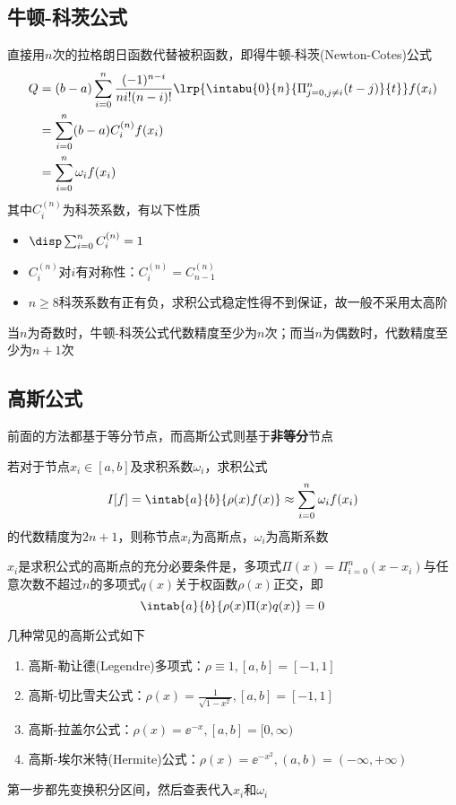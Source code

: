 \subsection{牛顿-科茨公式}
直接用$n$次的拉格朗日函数代替被积函数，即得牛顿-科茨(Newton-Cotes)公式
\[\begin{aligned}
    Q&=(b-a)\sum_{i=0}^n\frac{(-1)^{n-i}}{ni!(n-i)!}\lrp{\intabu{0}{n}{\Pi_{j=0,j\ne i}^n(t-j)}{t}}f(x_i)\\
    &=\sum_{i=0}^n(b-a)C_i^{(n)} f(x_i)\\
    &=\sum_{i=0}^n\omega_if(x_i)
\end{aligned}\]
其中$C_i^{(n)}$为科茨系数，有以下性质
\begin{itemize}
    \item $\disp\sum_{i=0}^nC_{i}^{(n)}=1$
    \item $C_i^{(n)}$对$i$有对称性：$C_i^{(n)}=C_{n-1}^{(n)}$
    \item $n\geq 8$科茨系数有正有负，求积公式稳定性得不到保证，故一般不采用太高阶
\end{itemize}
\begin{theorem}
    当$n$为奇数时，牛顿-科茨公式代数精度至少为$n$次；而当$n$为偶数时，代数精度至少为$n+1$次
\end{theorem}

\subsection{高斯公式}
前面的方法都基于等分节点，而高斯公式则基于\textbf{非等分}节点
\begin{definition}
    若对于节点$x_i\in[a,b]$及求积系数$\omega_i$，求积公式
    \[I[f]=\intab{a}{b}{\rho(x)f(x)}\approx\sum_{i=0}^n\omega_if(x_i)\]
    的代数精度为$2n+1$，则称节点$x_i$为高斯点，$\omega_i$为高斯系数
\end{definition}
\begin{theorem}
    $x_i$是求积公式的高斯点的充分必要条件是，多项式$\Pi(x)=\Pi_{i=0}^n(x-x_i)$与任意次数不超过$n$的多项式$q(x)$关于权函数$\rho(x)$正交，即
    \[\intab{a}{b}{\rho(x)\Pi(x)q(x)}=0\]
\end{theorem}

几种常见的高斯公式如下
\begin{enumerate}
    \item 高斯-勒让德(Legendre)多项式：$\rho\equiv 1,[a,b]=[-1,1]$
    \item 高斯-切比雪夫公式：$\rho(x)=\frac{1}{\sqrt{1-x^2}},[a,b]=[-1,1]$
    \item 高斯-拉盖尔公式：$\rho(x)=\ee^{-x},[a,b]=[0,\infty)$
    \item 高斯-埃尔米特(Hermite)公式：$\rho(x)=\ee^{-x^2},(a,b)=(-\infty,+\infty)$
\end{enumerate}
第一步都先变换积分区间，然后查表代入$x_i$和$\omega_i$

